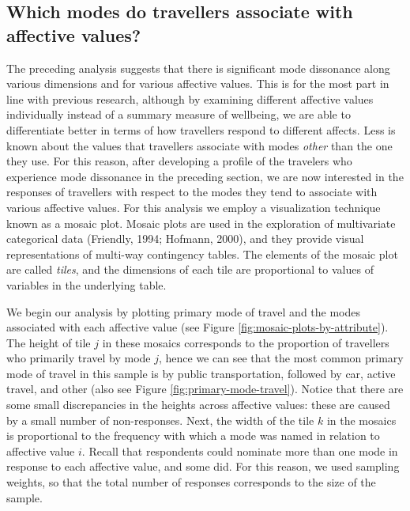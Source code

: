 \documentclass[]{elsarticle} %
\begin{document}
\hypertarget{which-modes-do-travellers-associate-with-affective-values}{%
\subsection{Which modes do travellers associate with affective
values?}\label{which-modes-do-travellers-associate-with-affective-values}}

The preceding analysis suggests that there is significant mode
dissonance along various dimensions and for various affective values.
This is for the most part in line with previous research, although by
examining different affective values individually instead of a summary
measure of wellbeing, we are able to differentiate better in terms of
how travellers respond to different affects. Less is known about the
values that travellers associate with modes \emph{other} than the one
they use. For this reason, after developing a profile of the travelers
who experience mode dissonance in the preceding section, we are now
interested in the responses of travellers with respect to the modes they
tend to associate with various affective values. For this analysis we
employ a visualization technique known as a mosaic plot. Mosaic plots
are used in the exploration of multivariate categorical data (Friendly,
1994; Hofmann, 2000), and they provide visual representations of
multi-way contingency tables. The elements of the mosaic plot are called
\emph{tiles}, and the dimensions of each tile are proportional to values
of variables in the underlying table.

We begin our analysis by plotting primary mode of travel and the modes
associated with each affective value (see Figure
\ref{fig:mosaic-plots-by-attribute}). The height of tile \(j\) in these
mosaics corresponds to the proportion of travellers who primarily travel
by mode \(j\), hence we can see that the most common primary mode of
travel in this sample is by public transportation, followed by car,
active travel, and other (also see Figure
\ref{fig:primary-mode-travel}). Notice that there are some small
discrepancies in the heights across affective values: these are caused
by a small number of non-responses. Next, the width of the tile \(k\) in
the mosaics is proportional to the frequency with which a mode was named
in relation to affective value \(i\). Recall that respondents could
nominate more than one mode in response to each affective value, and
some did. For this reason, we used sampling weights, so that the total
number of responses corresponds to the size of the sample.
\end{document}
